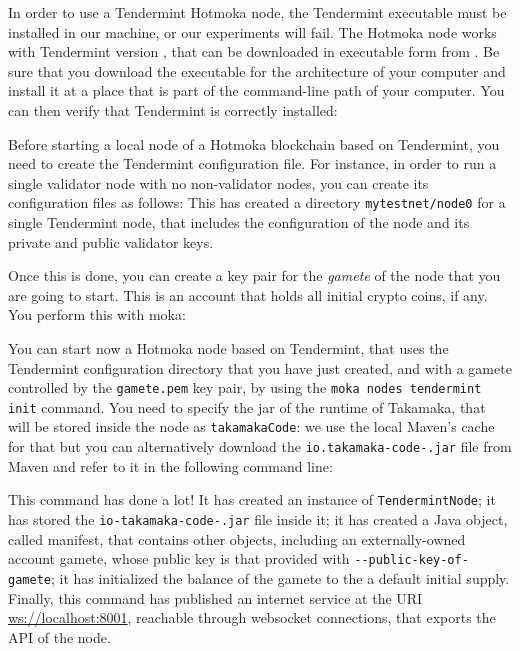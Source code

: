 In order to use a Tendermint Hotmoka node, the Tendermint executable must be
installed in our machine, or our experiments will fail. The Hotmoka node
works with Tendermint version \tendermintVersion{}, that can be downloaded in executable
form from .
Be sure that you download the executable for the architecture of your computer
and install it at a place that is
part of the command-line path of your computer. You can then verify that Tendermint is
correctly installed:
%

Before starting a local node of a Hotmoka blockchain based on Tendermint, you
need to create the Tendermint configuration file. For instance, in order
to run a single validator node with no non-validator nodes, you can create
its configuration files as follows:
%
%
This has created a directory \texttt{mytestnet/node0}
for a single Tendermint node, that includes the configuration
of the node and its private and public validator keys.

Once this is done, you can create a key pair for the \emph{gamete}
of the node that you are going to start. This is an account that holds all initial
crypto coins, if any. You perform this with moka:
%

You can start now a Hotmoka node based on Tendermint,
that uses the Tendermint configuration
directory that you have just created, and with a gamete controlled
by the \texttt{gamete.pem} key pair,
by using the \texttt{moka nodes tendermint init} command. You need
to specify the jar of the runtime of Takamaka, that will
be stored inside the node as \texttt{takamakaCode}: we use the
local Maven's cache for that but you can alternatively download the
\texttt{io.takamaka-code-\takamakaVersion{}.jar} file from Maven and refer to
it in the following command line:
%

This command has done a lot! It has created an instance
of \texttt{TendermintNode}; it has stored the
\texttt{io-takamaka-code-\takamakaVersion{}.jar} file
inside it; it has created
a Java object, called manifest, that contains other objects, including
an externally-owned account gamete, whose public key is
that provided with \texttt{-{}-public-key-of-gamete};
it has initialized the balance of the gamete to
the a default initial supply. Finally, this command
has published an internet service at the URI \url{ws://localhost:8001},
reachable through websocket connections, that exports the API of the node.

